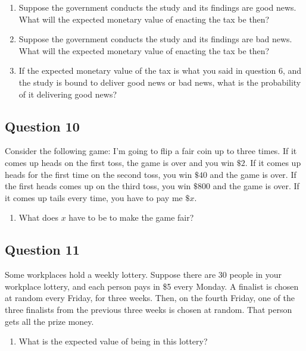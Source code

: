 \documentclass[11pt,]{article}
\providecommand{\tightlist}{%
  \setlength{\itemsep}{0pt}\setlength{\parskip}{0pt}}
\begin{document}
\begin{enumerate}
\def\labelenumi{\arabic{enumi}.}
\setcounter{enumi}{6}
\tightlist
\item
  Suppose the government conducts the study and its findings are good
  news. What will the expected monetary value of enacting the tax be
  then?
\item
  Suppose the government conducts the study and its findings are bad
  news. What will the expected monetary value of enacting the tax be
  then?
\item
  If the expected monetary value of the tax is what you said in question
  6, and the study is bound to deliver good news or bad news, what is
  the probability of it delivering good news?
\end{enumerate}

\hypertarget{question-10}{%
\subsection{Question 10}\label{question-10}}

Consider the following game: I'm going to flip a fair coin up to three
times. If it comes up heads on the first toss, the game is over and you
win \(\$2\). If it comes up heads for the first time on the second toss,
you win \(\$40\) and the game is over. If the first heads comes up on
the third toss, you win \(\$800\) and the game is over. If it comes up
tails every time, you have to pay me \(\$x\).

\begin{enumerate}
\def\labelenumi{\arabic{enumi}.}
\setcounter{enumi}{9}
\tightlist
\item
  What does \(x\) have to be to make the game fair?
\end{enumerate}

\hypertarget{question-11}{%
\subsection{Question 11}\label{question-11}}

Some workplaces hold a weekly lottery. Suppose there are 30 people in
your workplace lottery, and each person pays in \$5 every Monday. A
finalist is chosen at random every Friday, for three weeks. Then, on the
fourth Friday, one of the three finalists from the previous three weeks
is chosen at random. That person gets all the prize money.

\begin{enumerate}
\def\labelenumi{\arabic{enumi}.}
\setcounter{enumi}{10}
\tightlist
\item
  What is the expected value of being in this lottery?
\end{enumerate}
\end{document}
